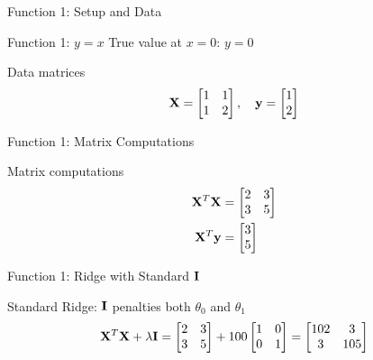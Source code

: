 \documentclass{beamer}
\begin{document}
\begin{frame}{Function 1: Setup and Data}
\begin{theorembox}{Function 1: $y = x$}
True value at $x=0$: $y = 0$
\end{theorembox}

\begin{codebox}{Data matrices}
$$\mathbf{X} = \begin{bmatrix} 1 & 1 \\ 1 & 2 \end{bmatrix}, \quad \mathbf{y} = \begin{bmatrix} 1 \\ 2 \end{bmatrix}$$
\end{codebox}
\end{frame}

\begin{frame}{Function 1: Matrix Computations}
\begin{codebox}{Matrix computations}
\begin{align}
\mathbf{X}^T\mathbf{X} &= \begin{bmatrix} 2 & 3 \\ 3 & 5 \end{bmatrix} \\
\mathbf{X}^T\mathbf{y} &= \begin{bmatrix} 3 \\ 5 \end{bmatrix}
\end{align}
\end{codebox}
\end{frame}

\begin{frame}{Function 1: Ridge with Standard $\mathbf{I}$}
\begin{codebox}{Standard Ridge: $\mathbf{I}$ penalties both $\theta_0$ and $\theta_1$}
$$\mathbf{X}^T\mathbf{X} + \lambda\mathbf{I} = \begin{bmatrix} 2 & 3 \\ 3 & 5 \end{bmatrix} + 100\begin{bmatrix} 1 & 0 \\ 0 & 1 \end{bmatrix} = \begin{bmatrix} 102 & 3 \\ 3 & 105 \end{bmatrix}$$
\end{codebox}
\end{frame}
\end{document}
